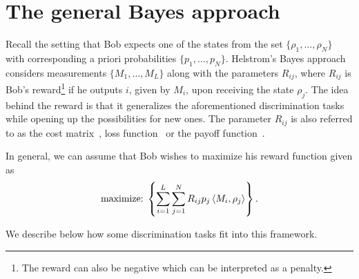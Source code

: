 \section{The general Bayes approach}\label{sec:ch3_QSD-gen_frame} 

Recall the setting that Bob expects one of the states from the set $\{\rho_1, \dots, \rho_N\}$ with corresponding a priori probabilities $\{p_1, \dots, p_N\}$.
Helstrom's Bayes approach~\cite{helstrom1969quantum} considers measurements $\{M_1, \dots, M_{L}\}$ along with the parameters $R_{ij}$, where $R_{ij}$ is Bob's reward\footnote{The reward can also be negative which can be interpreted as a penalty.} if he outputs $i$, given by $M_i$, upon receiving the state $\rho_j$.
The idea behind the reward is that it generalizes the aforementioned discrimination tasks while opening up the possibilities for new ones.
The parameter $R_{ij}$ is also referred to as the cost matrix~\cite{helstrom1969quantum, holevo1973statistical, holevo1978asymptotically, brody1996bayesian, helstrom2003bayes, yuen2003optimum, nakahira2012minimum}, loss function~\cite{wieczorek2018entropic} or the payoff function~\cite{watrous2018theory}. 

In general, we can assume that Bob wishes to maximize his reward function given as 
\begin{align}
    \label{eq:ch3_QSD-gen_QSD}
    \text{maximize:} \;  \left\{ \sum_{i=1}^L \sum_{j=1}^N R_{ij} p_j  \left\langle M_i, \rho_j \right\rangle \right\}.
\end{align} 

We describe below how some discrimination tasks fit into this framework. 

